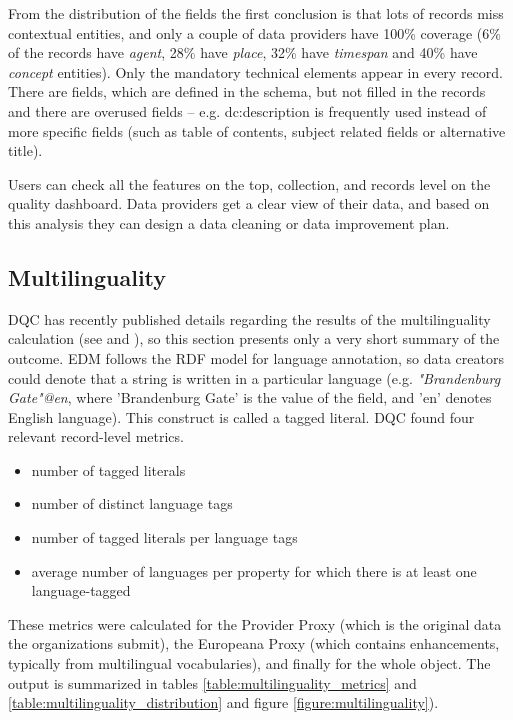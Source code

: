 From the distribution of the fields the first conclusion is that lots of records miss contextual entities, and only a couple of data providers have 100\% coverage (6\% of the records have \emph{agent}, 28\% have \emph{place}, 32\% have \emph{timespan} and 40\% have \emph{concept} entities). Only the mandatory technical elements appear in every record. There are fields, which are defined in the schema, but not filled in the records and there are overused fields – e.g. dc:description is frequently used instead of more specific fields (such as table of contents, subject related fields or alternative title).

Users can check all the features on the top, collection, and records level on the quality dashboard. Data providers get a clear view of their data, and based on this analysis they can design a data cleaning or data improvement plan.

\subsection{Multilinguality}

DQC has recently published details regarding the results of the multilinguality calculation (see \cite{charles2017} and \cite{kiraly-et-al2018}), so this section presents only a very short summary of the outcome. EDM follows the RDF model for language annotation, so data creators could denote that a string is written in a particular language (e.g. \emph{"Brandenburg Gate"@en}, where 'Brandenburg Gate' is the value of the field, and 'en' denotes English language). This construct is called a tagged literal. DQC found four relevant record-level metrics.

\begin{itemize}
 \setlength{\parskip}{0pt}
 \setlength{\itemsep}{0pt plus 1pt}
\item number of tagged literals
\item number of distinct language tags
\item number of tagged literals per language tags
\item average number of languages per property for which there is at least one language-tagged
\end{itemize}

These metrics were calculated for the Provider Proxy (which is the original data the organizations submit), the Europeana Proxy (which contains enhancements, typically from multilingual vocabularies), and finally for the whole object. The output is summarized in tables \ref{table:multilinguality_metrics} and \ref{table:multilinguality_distribution} and figure \ref{figure:multilinguality}).

